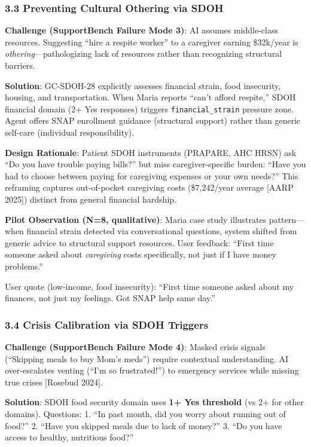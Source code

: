 \documentclass[
]{article}
\begin{document}
\subsubsection{3.3 Preventing Cultural Othering via
SDOH}\label{preventing-cultural-othering-via-sdoh}

\textbf{Challenge (SupportBench Failure Mode 3)}: AI assumes
middle-class resources. Suggesting ``hire a respite worker'' to a
caregiver earning \$32k/year is \emph{othering}---pathologizing lack of
resources rather than recognizing structural barriers.

\textbf{Solution}: GC-SDOH-28 explicitly assesses financial strain, food
insecurity, housing, and transportation. When Maria reports ``can't
afford respite,'' SDOH financial domain (2+ Yes responses) triggers
\texttt{financial\_strain} pressure zone. Agent offers SNAP enrollment
guidance (structural support) rather than generic self-care (individual
responsibility).

\textbf{Design Rationale}: Patient SDOH instruments (PRAPARE, AHC HRSN)
ask ``Do you have trouble paying bills?'' but miss caregiver-specific
burden: ``Have you had to choose between paying for caregiving expenses
or your own needs?'' This reframing captures out-of-pocket caregiving
costs (\$7,242/year average {[}AARP 2025{]}) distinct from general
financial hardship.

\textbf{Pilot Observation (N=8, qualitative)}: Maria case study
illustrates pattern---when financial strain detected via conversational
questions, system shifted from generic advice to structural support
resources. User feedback: ``First time someone asked about
\emph{caregiving} costs specifically, not just if I have money
problems.''

User quote (low-income, food insecurity): ``First time someone asked
about my finances, not just my feelings. Got SNAP help same day.''

\subsubsection{3.4 Crisis Calibration via SDOH
Triggers}\label{crisis-calibration-via-sdoh-triggers}

\textbf{Challenge (SupportBench Failure Mode 4)}: Masked crisis signals
(``Skipping meals to buy Mom's meds'') require contextual understanding.
AI over-escalates venting (``I'm so frustrated!'') to emergency services
while missing true crises {[}Rosebud 2024{]}.

\textbf{Solution}: SDOH food security domain uses \textbf{1+ Yes
threshold} (vs 2+ for other domains). Questions: 1. ``In past month, did
you worry about running out of food?'' 2. ``Have you skipped meals due
to lack of money?'' 3. ``Do you have access to healthy, nutritious
food?''
\end{document}
